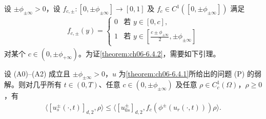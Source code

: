 \documentclass[../../main.tex]{subfiles}%
\begin{document}
设 $\pm\phi_{\pm\infty}>0$，设 $f_{c,\pm}:[0,\pm\phi_{\pm\infty}]\to[0,1]$ 及 $f_c\in C^1([0,\pm\phi_{\pm\infty}])$ 满足
\begin{align}
f_{c,\pm}(y)=
\begin{cases}
0 & \text{若 }y\in[0,c],\\
1 & \text{若 }y\in[\frac{c\pm\phi_{\pm\infty}}{2},\pm\phi_{\pm\infty}]
\end{cases} 
\label{align:ch6-6.117}
\end{align}
对某个 $c\in(0,\pm\phi_{+\infty})$。为证\cref{theorem:ch06-6.4.2}，需要如下引理。

\begin{lemma}\label{lemma:ch06-6.6.7}
设 (A0)--(A2) 成立且 $\pm\phi_{\pm\infty}>0$，$u$ 为\cref{theorem:ch06-6.4.1}所给出的问题 (P) 的弱解。则对几乎所有 $t\in(0,T)$、任意 $c\in(0,\pm\phi_{\pm\infty})$ 及任意 $\rho\in C^1_c(\Omega)$，$\rho\geqslant0$，有
\begin{align}
\langle[u^\pm_s(\cdot,t)]_{d,2},\rho\rangle
\leqslant\langle[u^\pm_{0s}]_{d,2},f_c(\phi^\pm(u_r(\cdot,t)))\rho\rangle. \label{align:ch6-6.118}
\end{align}
\end{lemma}
\end{document}
